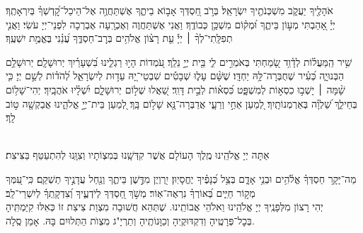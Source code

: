 אֹהָלֶ֖יךָ יַעֲקֹ֑ב מִשְׁכְּנֹתֶ֖יךָ יִשְׂרָאֵֽל׃
בְּרֹ֣ב חַ֭סְדְּךָ אָב֣וֹא בֵיתֶ֑ךָ אֶשְׁתַּחֲוֶ֥ה אֶל־הֵיכַל־קׇ֝דְשְׁךָ֗ בְּיִרְאָתֶֽךָ׃\\
יְיָ֗ אָ֭הַבְתִּי מְע֣וֹן בֵּיתֶ֑ךָ וּ֝מְק֗וֹם מִשְׁכַּ֥ן כְּבוֹדֶֽךָ׃
וַאֲנִי אֶשְׁתַּחֲוֶה וְאֶכְרָֽעָה אֶבְרְכָה לִפְנֵי־יְיָ עֹשִׂי׃
וַאֲנִ֤י
%
תְפִלָּֽתִי־לְךָ֨ ׀ יְיָ֡ עֵ֤ת רָצ֗וֹן אֱלֹהִ֥ים בְּרׇב־חַסְדֶּ֑ךָ עֲ֝נֵ֗נִי בֶּאֱמֶ֥ת יִשְׁעֶֽךָ׃

שִׁ֥יר הַֽמַּעֲל֗וֹת לְדָ֫וִ֥ד שָׂ֭מַחְתִּי בְּאֹמְרִ֣ים לִ֑י בֵּ֖ית יְיָ֣ נֵלֵֽךְ׃ עֹ֭מְדוֹת הָי֣וּ רַגְלֵ֑ינוּ בִּ֝שְׁעָרַ֗יִךְ יְרוּשָׁלָֽ͏ִם׃ יְרוּשָׁלַ֥͏ִם הַבְּנוּיָ֑ה כְּ֝עִ֗יר שֶׁחֻבְּרָה־לָּ֥הּ יַחְדָּֽו׃ שֶׁשָּׁ֨ם עָל֪וּ שְׁבָטִ֡ים שִׁבְטֵי־יָ֭הּ עֵד֣וּת לְיִשְׂרָאֵ֑ל לְ֝הֹד֗וֹת לְשֵׁ֣ם יְיָ׃ כִּ֤י שָׁ֨מָּה ׀ יָשְׁב֣וּ כִסְא֣וֹת לְמִשְׁפָּ֑ט כִּ֝סְא֗וֹת לְבֵ֣ית דָּוִֽד׃ שַׁ֭אֲלוּ שְׁל֣וֹם יְרוּשָׁלָ֑͏ִם יִ֝שְׁלָ֗יוּ אֹהֲבָֽיִךְ׃ יְהִי־שָׁל֥וֹם בְּחֵילֵ֑ךְ שַׁ֝לְוָ֗ה בְּאַרְמְנוֹתָֽיִךְ׃ לְ֭מַעַן אַחַ֣י וְרֵעָ֑י אֲדַבְּרָה־נָּ֖א שָׁל֣וֹם בָּֽךְ׃ לְ֭מַעַן בֵּית־יְיָ֣ אֱלֹהֵ֑ינוּ אֲבַקְשָׁ֖ה ט֣וֹב לָֽךְ׃


\\
אַתָּה יְיָ אֱלֹהֵֽינוּ מֶֽלֶךְ הָעוֹלָם \middot אֲשֶׁר קִדְּשָֽׁנוּ בְּמִצְוֹתָיו וְצִוָּֽנוּ לְהִתְעַטֵּף בַּצִּיצִת׃\\
\begin{footnotesize}
	מַה־יָּקָ֥ר חַסְדְּךָ֗ אֱלֹ֫הִ֥ים וּבְנֵ֥י אָדָ֑ם בְּצֵ֥ל כְּ֝נָפֶ֗יךָ יֶחֱסָיֽוּן׃ יִ֭רְוְיֻן מִדֶּ֣שֶׁן בֵּיתֶ֑ךָ וְנַ֖חַל עֲדָנֶ֣יךָ תַשְׁקֵֽם׃ כִּֽי־עִ֭מְּךָ מְק֣וֹר חַיִּ֑ים בְּ֝אוֹרְךָ֗ נִרְאֶה־אֽוֹר׃ מְשֹׁ֣ךְ חַ֭סְדְּךָ לְיֹדְעֶ֑יךָ וְ֝צִדְקָֽתְךָ֗ לְיִשְׁרֵי־לֵֽב׃\\
	יְהִי רָצוֹן מִלְּפָנֶֽיךָ יְיָ אֱלֹהֵֽינוּ וֵאלֹהֵי אֲבוֹתֵֽינוּ. שֶׁתְּהֵא חֲשׁוּבָה מִצְוַת צִיצִת זוֹ כְּאִלּוּ קִיַּמְתִּֽיהָ בְּכׇל־פְּרָטֶֽיהָ וְדִקְדּוּקֶֽיהָ וְכַוָּנוֹתֶֽיהָ וְתַרְיָ"ג מִצְוֺת הַתְּלוּיִם בָּהּ. אָמֵן סֶֽלָה. 
\end{footnotesize}

